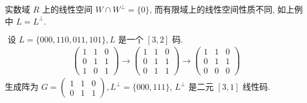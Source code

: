 \begin{remark}
实数域 $ R $ 上的线性空间 $ W \cap W^{\perp}=\{0\} $, 而有限域上的线性空间性质不同, 如上例中 $ L=L^{\perp} $.
\end{remark}

\begin{example}
$\text { 设 } L=\{000,110,011,101\}, L \text { 是一个 }[3,2] \text { 码. } $
$$
\begin{array}{l}
\left(\begin{array}{lll}
1 & 1 & 0 \\
0 & 1 & 1 \\
1 & 0 & 1
\end{array}\right) \rightarrow\left(\begin{array}{lll}
1 & 1 & 0 \\
0 & 1 & 1 \\
0 & 1 & 1
\end{array}\right) \rightarrow\left(\begin{array}{lll}
1 & 1 & 0 \\
0 & 1 & 1 \\
0 & 0 & 0
\end{array}\right)
\end{array}
$$
生成阵为 $ G=\left(\begin{array}{lll}1 & 1 & 0 \\ 0 & 1 & 1\end{array}\right), L^{\perp}=\{000,111\} $,
$ L^{\perp} $ 是二元 $ [3,1] $ 线性码.
\end{example}

